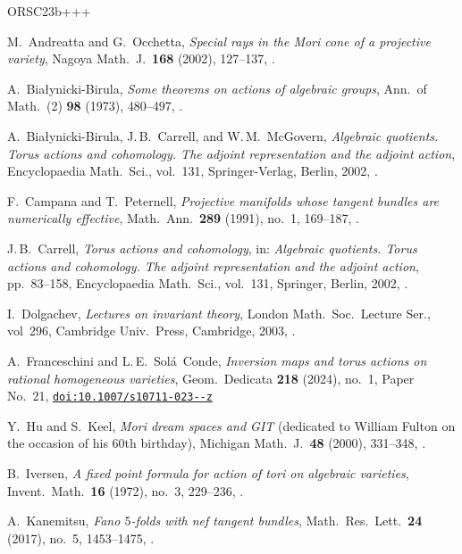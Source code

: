 \begin{thebibliography}{ORSC\etalchar{+}23b+++}

M.~Andreatta and G.~Occhetta, 
\emph{Special rays in the Mori cone of a projective variety}, 
Nagoya Math.~J.\ \textbf{168} (2002), 127--137,
.

A.~Bia{\l}ynicki-Birula, 
\emph{Some theorems on actions of algebraic groups},
Ann.\ of Math.~(2) \textbf{98} (1973), 480--497,
.

A.~Bia{\l}ynicki-Birula, J.\,B.~Carrell, and W.\,M.~McGovern, 
\emph{Algebraic quotients. Torus actions and cohomology. The
adjoint representation and the adjoint action}, Encyclopaedia Math.\ Sci.,
vol.~131, 
Springer-Verlag, Berlin, 2002,
.

F.~Campana and T.~Peternell, 
\emph{Projective manifolds whose tangent bundles are numerically effective}, 
Math.\ Ann.\ \textbf{289} (1991), no.~1, 169--187,
.

J.\,B.~Carrell, 
\emph{Torus actions and cohomology}, 
in: \emph{Algebraic quotients. Torus actions and cohomology. The
  adjoint representation and the adjoint action}, pp.~83--158,
Encyclopaedia Math.\ Sci., vol.~131, Springer, Berlin, 2002,
.

I.~Dolgachev, 
\emph{Lectures on invariant theory},
London Math.\ Soc.\ Lecture Ser., 
vol~296, 
Cambridge Univ.\ Press, Cambridge, 2003,
.

A.~Franceschini and L.\,E.~Sol\'{a}~Conde, 
\emph{Inversion maps and torus actions on rational homogeneous va\-ri\-e\-ties}, Geom.\ Dedicata \textbf{218} (2024), no.~1,
Paper No.~21, \href{https://doi.org/10.1007/s10711-023-00866-z}{\texttt{doi:10.1007/s10711-023--z}}

Y.~Hu and S.~Keel,
\emph{Mori dream spaces and GIT} (dedicated to William Fulton on the occasion of his 60th birthday),
Michigan Math.~J.\ \textbf{48} (2000), 331--348,
.

B.~Iversen, 
\emph{A fixed point formula for action of tori on algebraic varieties},
Invent.\ Math.\ \textbf{16} (1972), no.~3, 229--236,
.

A.~Kanemitsu,
\emph{Fano $5$-folds with nef tangent bundles}, 
Math.\ Res.\ Lett.\ \textbf{24} (2017), no.~5, 1453--1475,
.


\end{thebibliography}
